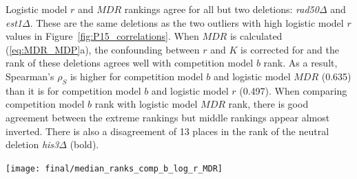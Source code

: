 Logistic model \(r\) and \(MDR\) rankings agree for all but two
deletions: \textit{rad50\(\Delta\)} and \textit{est1\(\Delta\)}. These
are the same deletions as the two outliers with high logistic model
\(r\) values in Figure~\ref{fig:P15_correlations}. When \(MDR\) is
calculated (\ref{eq:MDR_MDP}a), the confounding between \(r\) and
\(K\) is corrected for and the rank of these deletions agrees well
with competition model \(b\) rank. As a result, Spearman's
\(\rho_{S}\) is higher for competition model \(b\) and logistic model
\(MDR\) (0.635) than it is for competition model \(b\) and logistic
model \(r\) (0.497). When comparing competition model \(b\) rank with
logistic model \(MDR\) rank, there is good agreement between the
extreme rankings but middle rankings appear almost inverted. There is
also a disagreement of 13 places in the rank of the neutral deletion
\textit{his3\(\Delta\)} (bold).

\graphicspath{{images/rank/}}
\begin{Figure}
  \centering
  \texttt{[image: final/median\_ranks\_comp\_b\_log\_r\_MDR]}
  \label{fig:comp_vs_log_ranking}
\end{Figure}





